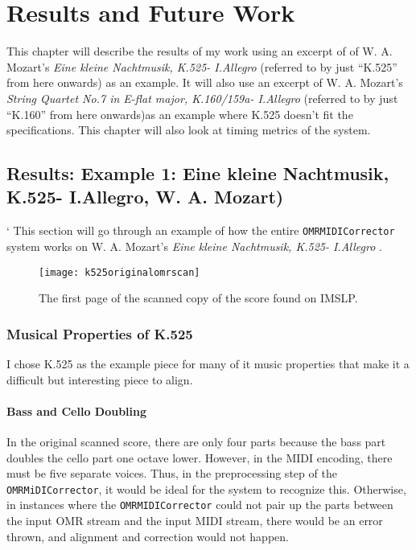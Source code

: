 \chapter{Results and Future Work}
This chapter will describe the results of my work using an excerpt of of W. A. Mozart's \textit{Eine kleine Nachtmusik, K.525- I.Allegro} (referred to by just ``K.525'' from here onwards) as an example. It will also use an excerpt of W. A. Mozart's \textit{String Quartet No.7 in E-flat major, K.160/159a- I.Allegro} (referred to by just ``K.160'' from here onwards)as an example where K.525 doesn't fit the specifications. This chapter will also look at timing metrics of the system.

\section{Results: Example 1: Eine kleine Nachtmusik, K.525- I.Allegro, W. A. Mozart)}		`
This section will go through an example of how the entire \texttt{OMRMIDICorrector} system works on W. A. Mozart's \textit{Eine kleine Nachtmusik, K.525- I.Allegro }.

\begin{figure}[H]
\centering
\texttt{[image: k525originalomrscan]}
\caption{The first page of the scanned copy of the score found on IMSLP.}
\end{figure}

\subsection{Musical Properties of K.525}
I chose K.525 as the example piece for many of it music properties that make it a difficult but interesting piece to align. 

\subsubsection{Bass and Cello Doubling}
In the original scanned score, there are only four parts because the bass part doubles the cello part one octave lower. However, in the MIDI encoding, there must be five separate voices. Thus, in the preprocessing step of the \texttt{OMRMiDICorrector}, it would be ideal for the system to recognize this. Otherwise, in instances where the \texttt{OMRMIDICorrector} could not pair up the parts between the input OMR stream and the input MIDI stream, there would be an error thrown, and alignment and correction would not happen. 

